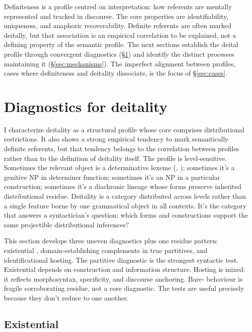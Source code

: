 \documentclass[12pt,letterpaper]{article}
\begin{document}
Definiteness is a profile centred on interpretation: how referents are mentally represented and tracked in discourse. The core properties are identifiability, uniqueness, and anaphoric recoverability. Definite referents are often marked deitally, but that association is an empirical correlation to be explained, not a defining property of the semantic profile. The next sections establish the deital profile through convergent diagnostics (§\ref{sec:diagnostics}) and identify the distinct processes maintaining it (§\ref{sec:mechanisms}). The imperfect alignment between profiles, cases where definiteness and deitality dissociate, is the focus of §\ref{sec:cases}.

\section{Diagnostics for deitality}\label{sec:diagnostics}

I characterize deitality as a structural profile whose core comprises distributional restrictions. It also shows a strong empirical tendency to mark semantically definite referents, but that tendency belongs to the correlation between profiles rather than to the definition of deitality itself. The profile is level-sensitive. Sometimes the relevant object is a determinative lexeme (, ); sometimes it's a genitive NP in determiner function; sometimes it's an NP in a particular construction; sometimes it's a diachronic lineage whose forms preserve inherited distributional residue. Deitality is a category distributed across levels rather than a single feature borne by one grammatical object in all contexts. It's the category that answers a syntactician's question: which forms and constructions support the same projectible distributional inferences?

This section develops three uneven diagnostics plus one residue pattern: existential , domain-establishing  complements in true partitives, and identificational hosting. The partitive diagnostic is the strongest syntactic test. Existential  depends on construction and information structure. Hosting is mixed: it reflects morphosyntax, specificity, and discourse anchoring. Bare- behaviour is fragile corroborating residue, not a core diagnostic. The tests are useful precisely because they don't reduce to one another.

\subsection{Existential }
\end{document}

